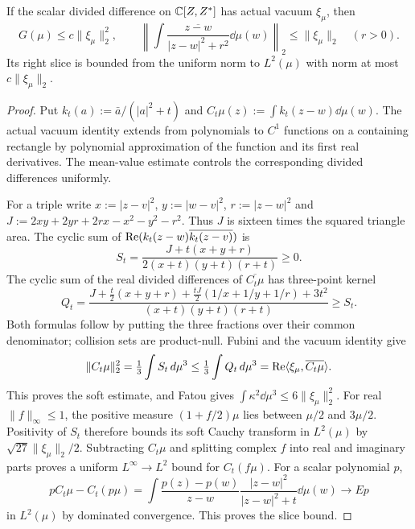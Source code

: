 \begin{lemma}\label{lem:scalar}
If the scalar divided difference on $\mathbb C[Z,Z^*]$ has actual vacuum $\xi_\mu$, then
\begin{equation}\label{eq:scalar-estimates}
 G(\mu)\le c\|\xi_\mu\|_2^2,\qquad
 \left\|\int\frac{\overline{z-w}}{|z-w|^2+r^2}\dd\mu(w)\right\|_2
 \le\|\xi_\mu\|_2\quad(r>0).
\end{equation}
Its right slice is bounded from the uniform norm to $L^2(\mu)$ with norm at most $c\|\xi_\mu\|_2$.
\end{lemma}
\begin{proof}
Put $k_t(a):=\bar a/(|a|^2+t)$ and $C_t\mu(z):=\int k_t(z-w)\dd\mu(w)$.
The actual vacuum identity extends from polynomials to $C^1$ functions on a containing rectangle by polynomial approximation of the function and its first real derivatives.
The mean-value estimate controls the corresponding divided differences uniformly.

For a triple write $x:=|z-v|^2$, $y:=|w-v|^2$, $r:=|z-w|^2$ and $J:=2xy+2yr+2rx-x^2-y^2-r^2$.
Thus $J$ is sixteen times the squared triangle area.
The cyclic sum of $\operatorname{Re}(k_t(z-w)\overline{k_t(z-v)})$ is
\[
 S_t=\frac{J+t(x+y+r)}{2(x+t)(y+t)(r+t)}\ge0.
\]
The cyclic sum of the real divided differences of $\overline{C_t\mu}$ has three-point kernel
\begin{equation}\label{eq:positive-soft}
 Q_t=\frac{J+\tfrac t2(x+y+r)+\tfrac{tJ}2(1/x+1/y+1/r)+3t^2}
 {(x+t)(y+t)(r+t)}\ge S_t.
\end{equation}
Both formulas follow by putting the three fractions over their common denominator; collision sets are product-null.
Fubini and the vacuum identity give
\[
 \|C_t\mu\|_2^2=\tfrac13\int S_t\,d\mu^3
 \le\tfrac13\int Q_t\,d\mu^3
 =\operatorname{Re}\langle\xi_\mu,\overline{C_t\mu}\rangle.
\]
This proves the soft estimate, and Fatou gives $\int\kappa^2\dd\mu^3\le6\|\xi_\mu\|_2^2$.
For real $\|f\|_\infty\le1$, the positive measure $(1+f/2)\mu$ lies between $\mu/2$ and $3\mu/2$.
Positivity of $S_t$ therefore bounds its soft Cauchy transform in $L^2(\mu)$ by $\sqrt{27}\|\xi_\mu\|_2/2$.
Subtracting $C_t\mu$ and splitting complex $f$ into real and imaginary parts proves a uniform $L^\infty\to L^2$ bound for $C_t(f\mu)$.
For a scalar polynomial $p$,
\[
 pC_t\mu-C_t(p\mu)
 =\int\frac{p(z)-p(w)}{z-w}\frac{|z-w|^2}{|z-w|^2+t}\dd\mu(w)
 \longrightarrow E p
\]
in $L^2(\mu)$ by dominated convergence.
This proves the slice bound.


\end{proof}
